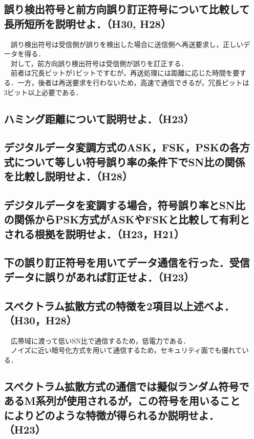 \subsection{誤り検出符号と前方向誤り訂正符号について比較して長所短所を説明せよ．（H30,
H28）}
　誤り検出符号は受信側が誤りを検出した場合に送信側へ再送要求し，正しいデータを得る．\\
　対して，前方向誤り検出符号は受信側が誤りを訂正する．\\
　前者は冗長ビットが1ビットですむが，再送処理には距離に応じた時間を要する．一方，後者は再送要求を行わないため，高速で通信できるが，冗長ビットは3ビット以上必要である．

\subsection{ハミング距離について説明せよ．（H23）}

\subsection{デジタルデータ変調方式のASK，FSK，PSKの各方式について等しい符号誤り率の条件下でSN比の関係を比較し説明せよ．（H28）}

\subsection{デジタルデータを変調する場合，符号誤り率とSN比の関係からPSK方式がASKやFSKと比較して有利とされる根拠を説明せよ．（H23，H21）}

\subsection{下の誤り訂正符号を用いてデータ通信を行った．受信データに誤りがあれば訂正せよ．（H23）}

\subsection{スペクトラム拡散方式の特徴を2項目以上述べよ．（H30，H28）}
　広帯域に渡って低いSN比で通信するため，低電力である．\\
　ノイズに近い暗号化方式を用いて通信するため，セキュリティ面でも優れている．

\subsection{スペクトラム拡散方式の通信では擬似ランダム符号であるM系列が使用されるが，この符号を用いることによりどのような特徴が得られるか説明せよ．（H23）}

